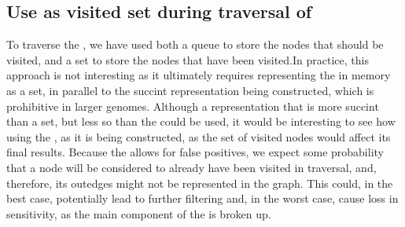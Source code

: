 \subsection{Use \dBHT as visited set during traversal of \dBCM}

To traverse the \dBCM, we have used both a queue to store the nodes that should be visited, and a set to store the nodes that have been visited.In practice, this approach is not interesting as it ultimately requires representing the \dBG in memory as a set, in parallel to the succint representation being constructed, which is prohibitive in larger genomes. Although a representation that is more succint than a set, but less so than the \dBHT could be used, it would be interesting to see how using the \dBHT, as it is being constructed, as the set of visited nodes would affect its final results. Because the \dBHT allows for false positives, we expect some probability that a node will be considered to already have been visited in traversal, and, therefore, its outedges might not be represented in the graph. This could, in the best case, potentially lead to further filtering and, in the worst case, cause loss in sensitivity, as the main component of the \dBG is broken up.